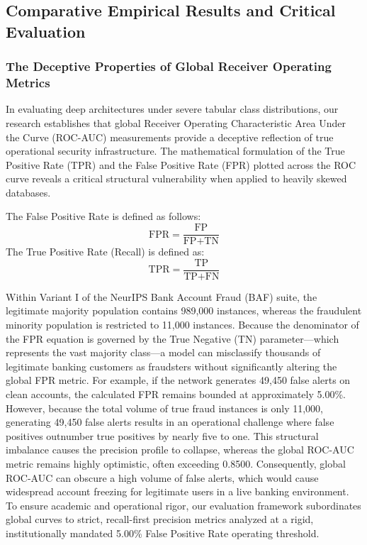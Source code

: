 \subsection{Comparative Empirical Results and Critical Evaluation}

\subsubsection{The Deceptive Properties of Global Receiver Operating Metrics}

In evaluating deep architectures under severe tabular class distributions, our research establishes that global Receiver Operating Characteristic Area Under the Curve (ROC-AUC) measurements provide a deceptive reflection of true operational security infrastructure. The mathematical formulation of the True Positive Rate (TPR) and the False Positive Rate (FPR) plotted across the ROC curve reveals a critical structural vulnerability when applied to heavily skewed databases.

The False Positive Rate is defined as follows:
\begin{equation}\label{eq:7.18}
    \text{FPR} = \frac{\text{FP}}{\text{FP} + \text{TN}}
\end{equation}
The True Positive Rate (Recall) is defined as:
\begin{equation}\label{eq:7.19}
    \text{TPR} = \frac{\text{TP}}{\text{TP} + \text{FN}}
\end{equation}

Within Variant I of the NeurIPS Bank Account Fraud (BAF) suite, the legitimate majority population contains 989,000 instances, whereas the fraudulent minority population is restricted to 11,000 instances. Because the denominator of the FPR equation is governed by the True Negative (TN) parameter---which represents the vast majority class---a model can misclassify thousands of legitimate banking customers as fraudsters without significantly altering the global FPR metric. For example, if the network generates 49,450 false alerts on clean accounts, the calculated FPR remains bounded at approximately 5.00\%. However, because the total volume of true fraud instances is only 11,000, generating 49,450 false alerts results in an operational challenge where false positives outnumber true positives by nearly five to one. This structural imbalance causes the precision profile to collapse, whereas the global ROC-AUC metric remains highly optimistic, often exceeding 0.8500. Consequently, global ROC-AUC can obscure a high volume of false alerts, which would cause widespread account freezing for legitimate users in a live banking environment. To ensure academic and operational rigor, our evaluation framework subordinates global curves to strict, recall-first precision metrics analyzed at a rigid, institutionally mandated 5.00\% False Positive Rate operating threshold.

